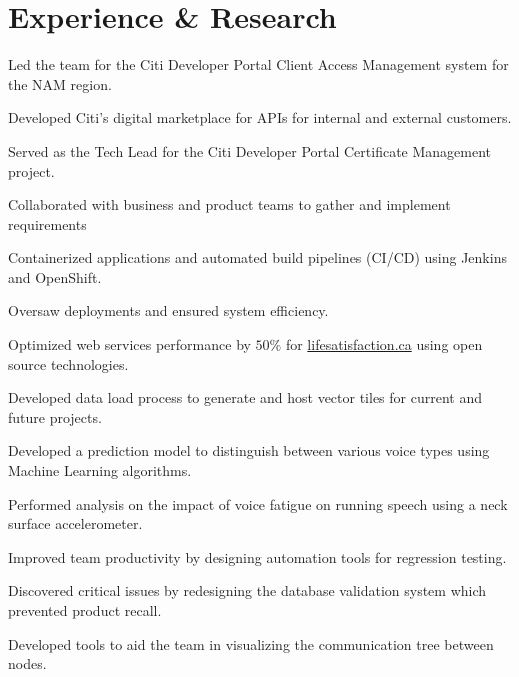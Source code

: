 \documentclass[]{sumbal-resume}
\begin{document}
\section{Experience \& Research}

\begin{tightemize}
\item Led the team for the Citi Developer Portal Client Access Management system for the NAM region.
\item Developed Citi's digital marketplace for APIs for internal and external customers.
\item Served as the Tech Lead for the Citi Developer Portal Certificate Management project.
\item Collaborated with business and product teams to gather and implement requirements
\item Containerized applications and automated build pipelines (CI/CD) using Jenkins and OpenShift.
\item Oversaw deployments and ensured system efficiency.
\end{tightemize}
	
\begin{tightemize}
\item Optimized web services performance by $50 \%$ for \href{http://lifesatisfaction.ca}{lifesatisfaction.ca} using open source technologies.
\item Developed data load process to generate and host vector tiles for current and future projects.
\end{tightemize}


\begin{tightemize}
\item Developed a prediction model to distinguish between various voice types using Machine Learning algorithms. 
\item Performed analysis on the impact of voice fatigue on running speech using a neck surface accelerometer.
\end{tightemize}


\begin{tightemize}
\item Improved team productivity by designing automation tools for regression testing. 
\item Discovered critical issues by redesigning the database validation system which prevented product recall.
\item Developed tools to aid the team in visualizing the communication tree between nodes.
\end{tightemize}
\end{document}
